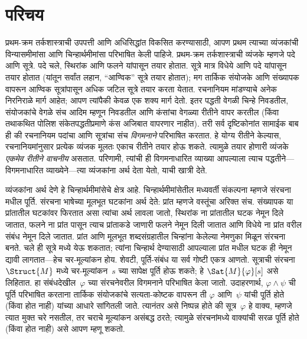 \section{परिचय}\label{fol:syn:int:sec}

प्रथम-क्रम तर्कशास्त्राची उपपत्ती आणि अधिसिद्धांत विकसित करण्यासाठी,
आपण प्रथम त्याच्या व्यंजकांची विन्यासमीमांसा आणि चिन्हार्थमीमांसा
परिभाषित केली पाहिजे. प्रथम-क्रम तर्कशास्त्राची व्यंजके म्हणजे पदे आणि
सूत्रे. पदे चले, स्थिरांक आणि फलने
यांपासून तयार होतात. सूत्रे मात्र विधेये आणि पदे
यांपासून तयार होतात (यांतून सर्वांत लहान, ``आण्विक'' सूत्रे
तयार होतात); मग तार्किक संयोजके आणि संख्यापक वापरून आण्विक
सूत्रांपासून अधिक जटिल सूत्रे तयार करता येतात. रचनानियम
मांडण्याचे अनेक निरनिराळे मार्ग आहेत; आपण त्यांपैकी केवळ एक शक्य
मार्ग देतो. इतर पद्धती वेगळी चिन्हे निवडतील, संयोजकांचे वेगळे संच
आदिम म्हणून निवडतील आणि कंसांचा वेगळ्या रीतीने वापर करतील (किंवा
तथाकथित पोलिश संकेतपद्धतीप्रमाणे कंस अजिबात वापरणार नाहीत). तरी सर्व
दृष्टिकोनांत सामाईक बाब ही की रचनानियम पदांचा आणि सूत्रांचा
संच \emph{विगमनाने} परिभाषित करतात. हे योग्य रीतीने केल्यास,
रचनानियमांनुसार प्रत्येक व्यंजक मूलतः एकाच रीतीने तयार होऊ शकते.
त्यामुळे तयार होणारी व्यंजके \emph{एकमेव रीतीने वाचनीय} असतात. परिणामी,
त्यांची ही विगमनाधारित व्याख्या आपल्याला त्याच पद्धतीने---विगमनाधारित
व्याख्येने---त्या व्यंजकांना अर्थ देता येतो, याची खात्री देते.

व्यंजकांना अर्थ देणे हे चिन्हार्थमीमांसेचे क्षेत्र आहे. चिन्हार्थमीमांसेतील
मध्यवर्ती संकल्पना म्हणजे संरचना मधील पूर्ति. संरचना
भाषेच्या मूलभूत घटकांना अर्थ देते: प्रांत म्हणजे वस्तूंचा अरिक्त
संच. संख्यापक या प्रांतातील घटकांवर फिरतात असा त्यांचा अर्थ लावला जातो,
स्थिरांक ना प्रांतातील घटक नेमून दिले जातात, फलने ना
प्रांत पासून त्याच प्रांताकडे जाणारी फलने नेमून दिली जातात आणि
विधेये ना प्रांत वरील संबंध नेमून दिले जातात. प्रांत
आणि मूलभूत शब्दसंग्रहातील चिन्हांना केलेल्या नेमणुका मिळून
संरचना बनते.
चले ही सूत्रे मध्ये येऊ शकतात; त्यांना चिन्हार्थ देण्यासाठी
आपल्याला प्रांत मधील घटक ही नेमून द्यावी लागतात---हेच
चर-मूल्यांकन होय. शेवटी, पूर्ति-संबंध या सर्व गोष्टी एकत्र आणतो.
सूत्राची संरचना~$\Struct{M}$ मध्ये चर-मूल्यांकन~$s$ च्या सापेक्ष पूर्ति होऊ शकते; हे $\Sat{M}{\varphi}[s]$ असे
लिहितात. हा संबंधदेखील~$\varphi$ च्या संरचनेवरील विगमनाने परिभाषित केला जातो.
उदाहरणार्थ, $\varphi \land \psi$ ची पूर्ति परिभाषित करताना तार्किक संयोजकांचे
सत्यता-कोष्टक वापरून ती $\varphi$ आणि~$\psi$ यांची पूर्ति होते (किंवा होत नाही)
यांच्या आधारे सांगितली जाते. त्यानंतर असे निष्पन्न होते की सूत्र~$\varphi$
हे वाक्य, म्हणजे त्यात मुक्त चरे नसतील, तर चराचे
मूल्यांकन असंबद्ध ठरते; त्यामुळे संरचनांमध्ये वाक्यांची
सरळ पूर्ति होते (किंवा होत नाही) असे आपण म्हणू शकतो.

